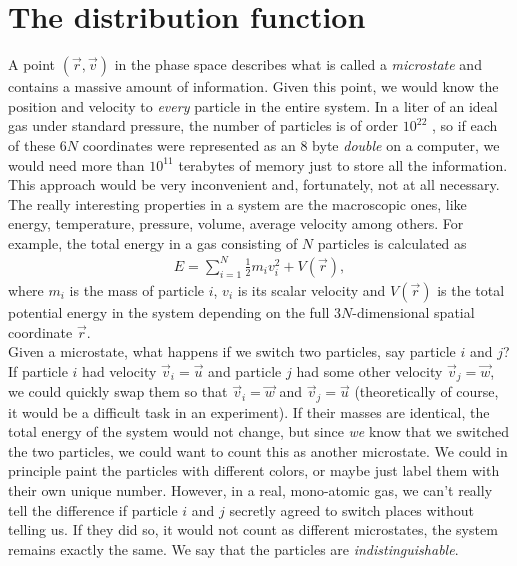 \section{The distribution function}
\label{sec:kinetic_theory_distribution_function}
A point $(\vec r, \vec v)$ in the phase space describes what is called a \textit{microstate} and contains a massive amount of information. Given this point, we would know the position and velocity to \textit{every} particle in the entire system. In a liter of an ideal gas under standard pressure, the number of particles is of order $10^{22}$ \cite{garcia2000numerical}, so if each of these $6N$ coordinates were represented as an 8 byte \textit{double} on a computer, we would need more than $10^{11}$ terabytes of memory just to store all the information. This approach would be very inconvenient and, fortunately, not at all necessary. The really interesting properties in a system are the macroscopic ones, like energy, temperature, pressure, volume, average velocity among others. For example, the total energy in a gas consisting of $N$ particles is calculated as
\begin{align*}
	E = \sum_{i=1}^N \frac{1}{2} m_i v_i^2 + V(\vec r),
\end{align*}
where $m_i$ is the mass of particle $i$, $v_i$ is its scalar velocity and $V(\vec r)$ is the total potential energy in the system depending on the full $3N$-dimensional spatial coordinate $\vec r$.\\
Given a microstate, what happens if we switch two particles, say particle $i$ and $j$? If particle $i$ had velocity $\vec v_i = \vec u$ and particle $j$ had some other velocity $\vec v_j = \vec w$, we could quickly swap them so that $\vec v_i = \vec w$ and $\vec v_j = \vec u$ (theoretically of course, it would be a difficult task in an experiment). If their masses are identical, the total energy of the system would not change, but since \textit{we} know that we switched the two particles, we could want to count this as another microstate. We could in principle paint the particles with different colors, or maybe just label them with their own unique number. However, in a real, mono-atomic gas, we can't really tell the difference if particle $i$ and $j$ secretly agreed to switch places without telling us. If they did so, it would not count as different microstates, the system remains exactly the same. We say that the particles are \textit{indistinguishable}.\\
